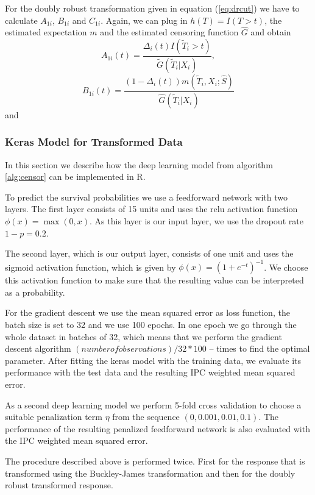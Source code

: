 \documentclass[12pt, a4paper]{article}
\theoremstyle{definition}
\theoremstyle{plain}
\numberwithin{equation}{section}
\numberwithin{figure}{section}
\numberwithin{table}{section}
\begin{document}
	For the doubly robust transformation given in equation (\ref{eq:drcut}) we have to calculate $A_{1i}$, $B_{1i}$ and $C_{1i}$.
	Again, we can plug in $h(T)=I(T>t)$, the estimated expectation $m$ and the estimated censoring function $\hat{G}$ and obtain
	\begin{equation*}
		A_{1i}(t)=\frac{\Delta_i(t)I(\tilde{T}_i >t)}{\tilde{G}(\tilde{T}_i\vert X_i)},
	\end{equation*}
	\begin{equation*}
		B_{1i}(t) = \frac{(1-\Delta_i(t))m(\tilde{T}_i, X_i; \hat{S})}{\hat{G}(\tilde{T}_i \vert X_i)}
	\end{equation*}
	and
	
	\subsubsection{Keras Model for Transformed Data}
	
	In this section we describe how the deep learning model from algorithm \ref{alg:censor} can be implemented in R.
	
	To predict the survival probabilities we use a feedforward network with two layers.
	The first layer consists of 15 units and uses the relu activation function $\phi(x) = \max(0, x)$.
	As this layer is our input layer, we use the dropout rate $1-p=0.2$.
	
	The second layer, which is our output layer, consists of one unit and uses the sigmoid activation function, which is given by $\phi(x)=(1+e^{-t})^{-1}$.
	We choose this activation function to make sure that the resulting value can be interpreted as a probability.
	
	For the gradient descent we use the mean squared error as loss function, the batch size is set to 32 and we use 100 epochs.
	In one epoch we go through the whole dataset in batches of 32, which means that we perform the gradient descent algorithm $(number of observations)/32*100$ -- times to find the optimal parameter.
	After fitting the keras model with the training data, we evaluate its performance with the test data and the resulting IPC weighted mean squared error.
	
	As a second deep learning model we perform 5-fold cross validation to choose a suitable penalization term $\eta$ from the sequence $(0, 0.001, 0.01, 0.1)$.
	The performance of the resulting penalized feedforward network is also evaluated with the IPC weighted mean squared error.
	
	The procedure described above is performed twice.
	First for the response that is transformed using the Buckley-James transformation and then for the doubly robust transformed response.
\end{document}
